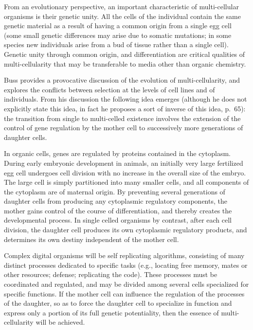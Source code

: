 From an evolutionary perspective, an important characteristic of
multi-cellular organisms is their genetic unity.  All the cells of
the individual contain the same genetic material as a result of having
a common origin from a single egg cell (some small genetic differences
may arise due to somatic mutations; in some species new individuals
arise from a bud of tissue rather than a single cell).  Genetic unity
through common origin, and differentiation are critical qualities of
multi-cellularity that may be transferable to media other than organic
chemistry.

Buss \cite{Buss} provides a provocative discussion of the evolution of
multi-cellularity, and explores the conflicts between selection at the
levels of cell lines and of individuals.  From his discussion the
following idea emerges (although he does not explicitly state this idea,
in fact he proposes a sort of inverse of this idea, p.\ 65): the
transition from single to multi-celled existence involves the extension
of the control of gene regulation by the mother cell to successively
more generations of daughter cells.

In organic cells, genes are regulated by proteins contained in the
cytoplasm.  During early embryonic development in animals, an initially
very large fertilized egg cell undergoes cell division with no increase
in the overall size of the embryo.  The large cell is simply partitioned
into many smaller cells, and all components of the cytoplasm are of
maternal origin.  By preventing several generations of daughter cells
from producing any cytoplasmic regulatory components, the mother gains
control of the course of differentiation, and thereby creates the
developmental process.  In single celled organisms by contrast, after
each cell division, the daughter cell produces its own cytoplasmic
regulatory products, and determines its own destiny independent of the
mother cell.

Complex digital organisms will be self replicating algorithms, consisting
of many distinct processes dedicated to specific tasks (e.g., locating
free memory, mates or other resources; defense; replicating the code).
These processes must be coordinated and regulated, and may be divided
among several cells specialized for specific functions.  If the mother
cell can influence the regulation of the processes of the daughter, so
as to force the daughter cell to specialize in function and express only
a portion of its full genetic potentiality, then the essence of
multi-cellularity will be achieved.

